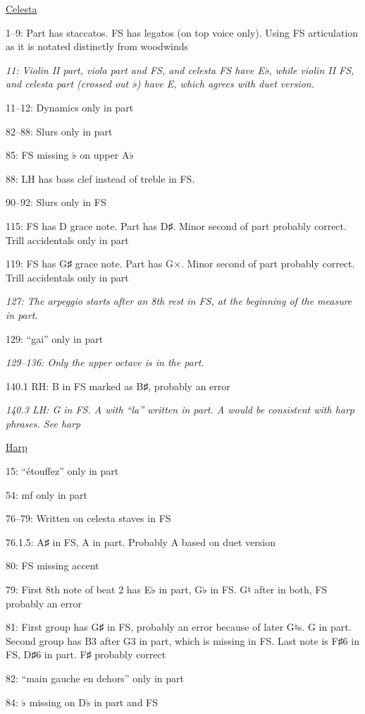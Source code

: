 \documentclass[twoside]{article}
\begin{document}
\begin{hangparas}{15pt}{1}
\begin{multicols}{2}
\underline{Celesta}

1--9: Part has staccatos. FS has legatos (on top voice only). Using FS articulation as it is notated distinctly from woodwinds

\textit{11: Violin II part, viola part and FS, and celesta FS have E♭, while violin II FS, and celesta part (crossed out ♭) have E, which agrees with duet version.}

11--12: Dynamics only in part

82--88: Slurs only in part

85: FS missing ♭ on upper A♭

88: LH has bass clef instead of treble in FS.

90--92: Slurs only in FS

115: FS has D grace note. Part has D♯. Minor second of part probably correct. Trill accidentals only in part

119: FS has G♯ grace note. Part has G$\times$. Minor second of part probably correct. Trill accidentals only in part

\textit{127: The arpeggio starts after an 8th rest in FS, at the beginning of the measure in part.}

129: ``gai'' only in part

\textit{129--136: Only the upper octave is in the part.}

140.1 RH: B in FS marked as B♯, probably an error

\textit{140.3 LH: G in FS. A with ``la'' written in part. A would be consistent with harp phrases. See harp}

\underline{Harp}

15: ``étouffez'' only in part

54: mf only in part

76--79: Written on celesta staves in FS

76.1.5: A♯ in FS, A in part. Probably A based on duet version

80: FS missing accent

79: First 8th note of beat 2 has E♭ in part, G♭ in FS. G♮ after in both, FS probably an error

81: First group has G♯ in FS, probably an error because of later G♮s. G in part. Second group has B3 after G3 in part, which is missing in FS. Last note is F♯6 in FS, D♯6 in part. F♯ probably correct

82: ``main gauche en dehors'' only in part

84: ♭ missing on D♭ in part and FS


\end{multicols}
\end{hangparas}
\end{document}
